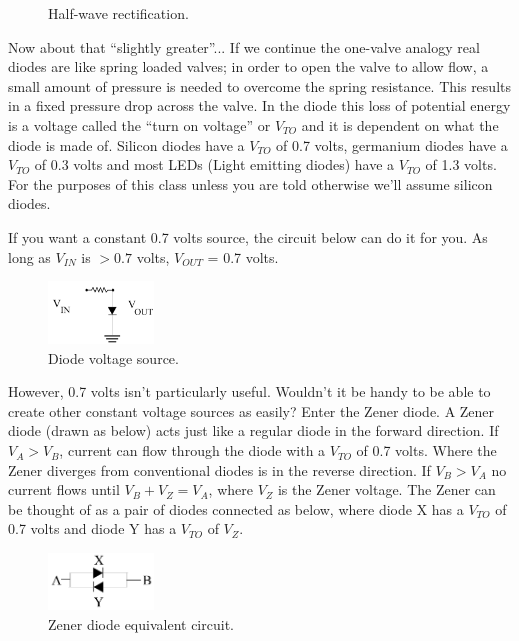 \documentclass[12pt]{article}
\begin{document}
\begin{enumerate}[1.]
\begin{figure}[!ht]
\begin{center}
\caption*{Half-wave rectification.}
\end{center}
\end{figure}
\par Now about that ``slightly greater''... 
If we continue the one-valve analogy real diodes are like spring loaded valves; 
in order to open the valve to allow flow, a small amount of pressure is needed to overcome the spring resistance. 
This results in a fixed pressure drop across the valve. 
In the diode this loss of potential energy is a voltage called the ``turn on voltage'' or $V_{TO}$ and it is dependent on what the diode is made of. 
Silicon diodes have a $V_{TO}$ of 0.7 volts, germanium diodes have a $V_{TO}$ of 0.3 volts and most LEDs (Light emitting diodes) have a $V_{TO}$ of 1.3 volts. 
For the purposes of this class unless you are told otherwise we'll assume silicon diodes.

\par If you want a constant 0.7 volts source, the circuit below can do it for you. As long as $V_{IN}$ is  $> 0.7$ volts, $V_{OUT}$ = 0.7 volts.
\begin{figure}[!ht]
\begin{center}
\includegraphics[width=0.25\textwidth,trim=0 0 0 0,clip=false]{diodesource.png}
\caption*{Diode voltage source.}
\end{center}
\end{figure}
\par However, 0.7 volts isn't particularly useful. Wouldn't it be handy to be able to create other constant voltage sources as easily? Enter the Zener diode.
A Zener diode (drawn as below) acts just like a regular diode in the forward direction. 
If $V_A > V_B$, current can flow through the diode with a $V_{TO}$ of 0.7 volts. 
Where the Zener diverges from conventional diodes is in the reverse direction. 
If $V_B > V_A$ no current flows until $V_B + V_Z = V_A$, where $V_Z$ is the Zener voltage.
The Zener can be thought of as a pair of diodes connected as below, where diode X has a $V_{TO}$ of 0.7 volts and diode Y has a $V_{TO}$ of $V_Z$.
\begin{figure}[!ht]
\begin{center}
\includegraphics[width=0.25\textwidth,trim=0 0 0 0,clip=false]{zener.png}
\caption*{Zener diode equivalent circuit.}
\end{center}
\end{figure}


\end{enumerate}
\end{document}

